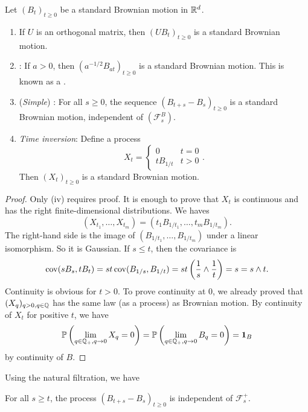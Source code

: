 \documentclass[a4paper]{article}
\begin{document}
\begin{prop}
  Let $(B_t)_{t \geq 0}$ be a standard Brownian motion in $\mathbb{R}^d$.
  \begin{enumerate}
    \item If $U$ is an orthogonal matrix, then $(UB_t)_{t \geq 0}$ is a standard Brownian motion.
    \item {}: If $a > 0$, then $(a^{-1/2} B_{at})_{t \geq 0}$ is a standard Brownian motion. This is known as a .
    \item (\emph{Simple}) : For all $s \geq 0$, the sequence $(B_{t + s} - B_s)_{t \geq 0}$ is a standard Brownian motion, independent of $(\mathcal{F}_s^B)$.
    \item \emph{Time inversion}: Define a process
      \[
        X_t =
        \begin{cases}
          0 & t = 0\\
          t B_{1/t} & t > 0
        \end{cases}.
      \]
      Then $(X_t)_{t \geq 0}$ is a standard Brownian motion.
  \end{enumerate}
\end{prop}

\begin{proof}
  Only (iv) requires proof. It is enough to prove that $X_t$ is continuous and has the right finite-dimensional distributions. We haves
  \[
    (X_{t_1}, \ldots, X_{t_m}) = (t_1 B_{1/t_1}, \ldots, t_m B_{1/t_m}).
  \]
  The right-hand side is the image of $(B_{1/t_1}, \ldots, B_{1/t_m})$ under a linear isomorphism. So it is Gaussian. If $s \leq t$, then the covariance is
  \[
    \operatorname{cov}(s B_s, t B_t) = st \operatorname{cov}(B_{1/s}, B_{1/t}) = st \left(\frac{1}{s} \wedge \frac{1}{t}\right) = s = s \wedge t.
  \]
  Continuity is obvious for $t > 0$. To prove continuity at $0$, we already proved that $(X_q)_{q > 0, q \in \mathbb{Q}}$ has the same law (as a process) as Brownian motion. By continuity of $X_t$ for positive $t$, we have
  \[
    \mathbb{P} \left(\lim_{q \in \mathbb{Q}_+, q \to 0} X_q = 0\right) = \mathbb{P} \left(\lim_{q \in \mathbb{Q}_+, q \to 0} B_q = 0\right) = \mathbf{1}_B
  \]
  by continuity of $B$.
\end{proof}

Using the natural filtration, we have
\begin{thm}
  For all $s \geq t$, the process $(B_{t + s} - B_s)_{t \geq 0}$ is independent of $\mathcal{F}_s^+$.
\end{thm}
\end{document}
